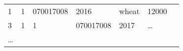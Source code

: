 \documentclass[12pt,]{article}
\begin{document}
\begin{longtable}[]{@{}lllllll@{}}
\begin{minipage}[t]{0.07\columnwidth}
1\strut
\end{minipage} & \begin{minipage}[t]{0.07\columnwidth}\raggedright
1\strut
\end{minipage} & \begin{minipage}[t]{0.13\columnwidth}\raggedright
070017008\strut
\end{minipage} & \begin{minipage}[t]{0.13\columnwidth}\raggedright
2016\strut
\end{minipage} & \begin{minipage}[t]{0.17\columnwidth}\raggedright
wheat\strut
\end{minipage} & \begin{minipage}[t]{0.17\columnwidth}\raggedright
12000\strut
\end{minipage}\tabularnewline
\begin{minipage}[t]{0.07\columnwidth}\raggedright
3\strut
\end{minipage} & \begin{minipage}[t]{0.07\columnwidth}\raggedright
1\strut
\end{minipage} & \begin{minipage}[t]{0.07\columnwidth}\raggedright
1\strut
\end{minipage} & \begin{minipage}[t]{0.13\columnwidth}\raggedright
070017008\strut
\end{minipage} & \begin{minipage}[t]{0.13\columnwidth}\raggedright
2017\strut
\end{minipage} & \begin{minipage}[t]{0.17\columnwidth}\raggedright
\ldots{}\strut
\end{minipage} & \begin{minipage}[t]{0.17\columnwidth}\raggedright
\strut
\end{minipage}\tabularnewline
\begin{minipage}[t]{0.07\columnwidth}\raggedright
\ldots{}\strut
\end{minipage} & \begin{minipage}[t]{0.07\columnwidth}\raggedright
\strut
\end{minipage} & \begin{minipage}[t]{0.07\columnwidth}\raggedright
\strut
\end{minipage} & \begin{minipage}[t]{0.13\columnwidth}\raggedright
\strut
\end{minipage} & \begin{minipage}[t]{0.13\columnwidth}\raggedright
\strut
\end{minipage} & \begin{minipage}[t]{0.17\columnwidth}\raggedright
\strut
\end{minipage} & \begin{minipage}[t]{0.17\columnwidth}\raggedright
\strut
\end{minipage}\tabularnewline
\bottomrule
\end{longtable}
\end{document}
